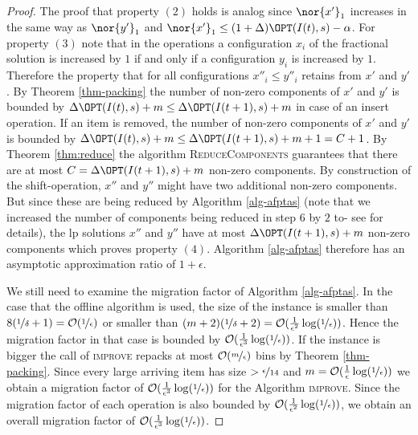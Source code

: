 \begin{proof}
	The proof that property $(2)$ holds is analog since $\nor{x'}_1$ increases in the same way as $\nor{y'}_1$ and $\nor{x'}_1   \leq (1+ \Delta) \OPT(I(t),s) - \alpha$.
	For property $(3)$ note that in the operations a configuration $x_i$ of the fractional solution is increased by $1$ if and only if a configuration $y_i$ is increased by $1$. Therefore the property that for all configurations $x''_i \leq y''_i$ retains from $x'$ and $y'$. By Theorem \ref{thm-packing} the number of non-zero components of $x'$ and $y'$ is bounded by $\Delta \OPT(I(t),s) +m \leq \Delta \OPT(I(t+1),s) +m$ in case of an insert operation. If an item is removed, the number of non-zero components of $x'$ and $y'$ is bounded by $\Delta \OPT(I(t),s) +m \leq \Delta \OPT(I(t+1),s) +m +1 = C+1$. By Theorem \ref{thm:reduce} the algorithm \textsc{ReduceComponents} guarantees that there are at most $C=\Delta \OPT(I(t+1),s) +m$ non-zero components. By construction of the shift-operation, $x''$ and $y''$ might have two additional non-zero components. But since these are being reduced by Algorithm \ref{alg-afptas} (note that we increased the number of components being reduced in step 6 by $2$ to- see \cite{jansen2013binpacking} for details), the \ac{lp} solutions $x''$ and $y''$ have at most $\Delta \OPT(I(t+1),s) +m$ non-zero components which proves property $(4)$. Algorithm \ref{alg-afptas} therefore has an asymptotic approximation ratio of $1+\epsilon$.
    
    We still need to examine the migration factor of Algorithm \ref{alg-afptas}. In the case that the offline algorithm is used, the size of the instance is smaller than $8 (\nicefrac{1}{\delta} +1) = \mathcal{O}(\nicefrac{1}{\epsilon})$ or smaller than $(m+2)(\nicefrac{1}{\delta} +2) = \mathcal{O}(\frac{1}{\epsilon^2} \log(\nicefrac{1}{\epsilon}))$. Hence the migration factor in that case is bounded by $\mathcal{O}(\frac{1}{\epsilon^3} \log(\nicefrac{1}{\epsilon}))$. If the instance is bigger the call of \textsc{improve} repacks at most $\mathcal{O}(\nicefrac{m}{\epsilon})$ bins by Theorem \ref{thm-packing}. Since every large arriving item has size $> \nicefrac{\epsilon}{14}$ and $m = \mathcal{O}(\frac{1}{\epsilon} \log (\nicefrac{1}{\epsilon}))$ we obtain a migration factor of $\mathcal{O}(\frac{1}{\epsilon^3} \log (\nicefrac{1}{\epsilon}))$ for the Algorithm \textsc{improve}. Since the migration factor of each operation is also bounded by $\mathcal{O}(\frac{1}{\epsilon^2} \log (\nicefrac{1}{\epsilon}))$, we obtain an overall migration factor of $\mathcal{O}(\frac{1}{\epsilon^3} \log (\nicefrac{1}{\epsilon}))$. 
    

\end{proof}
